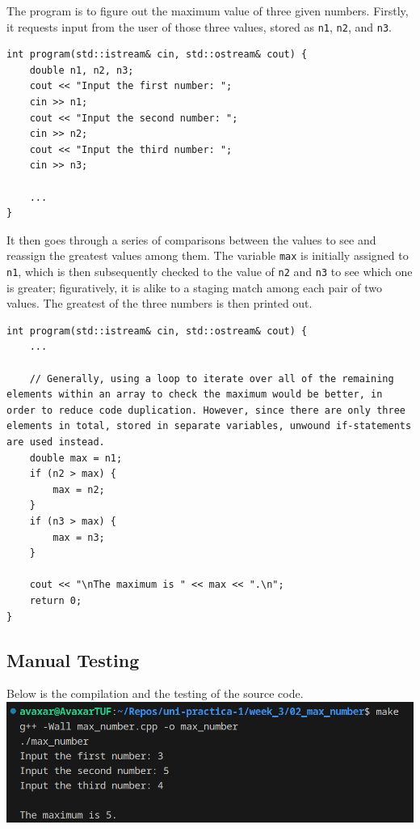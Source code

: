 \documentclass[12pt]{article}
\begin{document}
The program is to figure out the maximum value of three given numbers. Firstly, it requests input from the user of those three values, stored as \texttt{n1}, \texttt{n2}, and \texttt{n3}.

\begin{verbatim}
int program(std::istream& cin, std::ostream& cout) {
    double n1, n2, n3;
    cout << "Input the first number: ";
    cin >> n1;
    cout << "Input the second number: ";
    cin >> n2;
    cout << "Input the third number: ";
    cin >> n3;

    ...
}
\end{verbatim}

It then goes through a series of comparisons between the values to see and reassign the greatest values among them. The variable \texttt{max} is initially assigned to \texttt{n1}, which is then subsequently checked to the value of \texttt{n2} and \texttt{n3} to see which one is greater; figuratively, it is alike to a staging match among each pair of two values. The greatest of the three numbers is then printed out.

\begin{verbatim}
int program(std::istream& cin, std::ostream& cout) {
    ...

    // Generally, using a loop to iterate over all of the remaining elements within an array to check the maximum would be better, in order to reduce code duplication. However, since there are only three elements in total, stored in separate variables, unwound if-statements are used instead.
    double max = n1;
    if (n2 > max) {
        max = n2;
    }
    if (n3 > max) {
        max = n3;
    }

    cout << "\nThe maximum is " << max << ".\n";
    return 0;
}
\end{verbatim}

\subsection{Manual Testing}
Below is the compilation and the testing of the source code.
\newline\includegraphics[width=\textwidth]{02_max_number}
\end{document}
